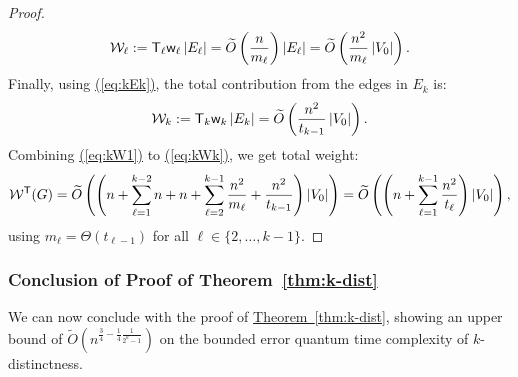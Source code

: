 \documentclass{article}
\newcommand{\eq}[1]{\hyperref[eq:#1]{(\ref*{eq:#1})}}
\newcommand{\thm}[1]{\hyperref[thm:#1]{Theorem~\ref*{thm:#1}}}
\renewcommand{\>}{\rangle}
\newcommand{\<}{\langle}
\renewcommand{\(}{\left(}
\renewcommand{\)}{\right)}
\def\abs#1{\left| #1 \right|}
\def\w{{\sf w}}
\begin{document}
\begin{proof}
\begin{equation}
		{\cal W}_{\ell}:= {\sf T}_{\ell}\w_{\ell}\abs{E_{\ell}} =\widetilde{O}\left( \frac{n}{m_{\ell}} \right)|E_{\ell}|
		=\widetilde{O}\left(\frac{n^2}{m_{\ell}}\abs{V_0}\right).\label{eq:kWk1}
	\end{equation}
Finally, using \eq{kEk}, the total contribution from the edges in $E_k$ is:
	\begin{equation}
		{\cal W}_k := {\sf T}_k\w_k\abs{E_k}=\widetilde{O}\left(\frac{n^2}{t_{k-1}}\abs{V_0}\right).\label{eq:kWk}
	\end{equation}
	Combining \eq{kW1} to \eq{kWk}, we get total weight:
\begin{align*}
{\cal W}^{\sf T}(G) = \widetilde{O}\left(\left(n +\sum_{\ell=1}^{k-2}n+ n + \sum_{\ell=2}^{k-1} \frac{n^2}{m_{\ell}} + \frac{n^2}{t_{k-1}}\right)\abs{V_0}\right)
= \widetilde{O}\left(\left(n  + \sum_{\ell=1}^{k-1} \frac{n^2}{t_{\ell}}\right)\abs{V_0}\right),
\end{align*}
using $m_{\ell}=\Theta(t_{\ell-1})$ for all $\ell\in \{2,\dots,k-1\}$. 
\end{proof}


\subsubsection{Conclusion of Proof of Theorem~\ref{thm:k-dist}}\label{sec:conclusion}

We can now conclude with the proof of \thm{k-dist}, showing an upper bound of $\widetilde{O}\left(n^{\frac{3}{4}-\frac{1}{4}\frac{1}{2^k-1}}\right)$ on the bounded error quantum time complexity of $k$-distinctness. 
\end{document}
